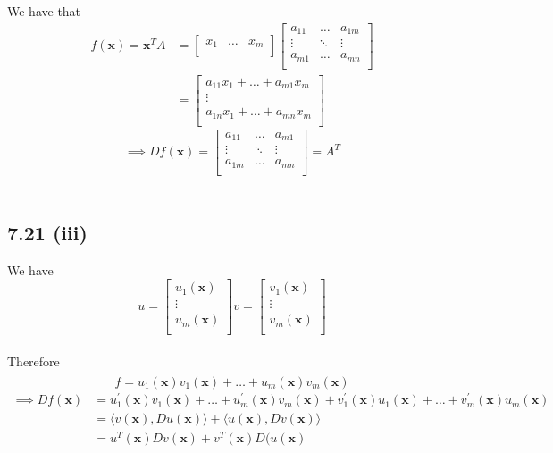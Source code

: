 \documentclass[letterpaper,12pt]{article}
\theoremstyle{definition}
\begin{document}
  
  We have that\\ 
 \begin{align*}
 f(\textbf{x})=\textbf{x}^{T}A&=
 \begin{bmatrix}
   x_{1} & \ldots & x_{m} \\
  \end{bmatrix}
 \begin{bmatrix}
   a_{11} & \ldots & a_{1m}\\
   \vdots & \ddots & \vdots \\
   a_{m1}  & \ldots & a_{mn} \\
  \end{bmatrix}
   \\
  &=\begin{bmatrix}
   a_{11}x_{1}+ \ldots + a_{m1}x_{m} \\
   \vdots  \\
   a_{1n}x_{1}+ \ldots + a_{mn}x_{m}   \\
  \end{bmatrix}
 \end{align*}
\[ \implies Df(\textbf{x}) = \begin{bmatrix}
   a_{11} & \ldots & a_{m1}\\
   \vdots & \ddots & \vdots \\
   a_{1m}  & \ldots & a_{mn} \\
  \end{bmatrix} = A^{T} \] \\
\subsection*{7.21 (iii)}


 We have \[u=\begin{bmatrix}
   u_{1}(\textbf{x}) \\
   \vdots  \\
   u_{m}(\textbf{x}) \\
  \end{bmatrix} 
  v=\begin{bmatrix}
   v_{1}(\textbf{x}) \\
   \vdots  \\
   v_{m}(\textbf{x}) \\
  \end{bmatrix}\] \\ Therefore 
 \begin{align*}
 \end{align*} 
  \[f = u_{1}(\textbf{x})v_{1}(\textbf{x})+ \ldots +u_{m}(\textbf{x})v_{m}(\textbf{x}) \]
  \begin{align*}
   \implies  Df(\textbf{x}) &= u^{'}_{1}(\textbf{x})v_{1}(\textbf{x})+ \ldots +u^{'}_{m}(\textbf{x})v_{m}(\textbf{x})+v^{'}_{1}(\textbf{x})u_{1}(\textbf{x})+ \ldots +v^{'}_{m}(\textbf{x})u_{m}(\textbf{x}) 
    \\&= \langle v(\textbf{x}),Du(\textbf{x}) \rangle+ \langle u(\textbf{x}),Dv(\textbf{x})\rangle
   \\&= u^{T}(\textbf{x})Dv(\textbf{x})+v^{T}(\textbf{x})D(u(\textbf{x}) 
  \end{align*}
\end{document}

